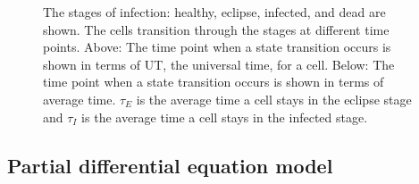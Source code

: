 \begin{figure}
\begin{tikzpicture}
    \end{tikzpicture}
\caption{The stages of infection: healthy, eclipse, infected, and dead are shown. The cells transition through the stages at different time points. Above: The time point when a state transition occurs is shown in terms of UT, the universal time, for a cell. %
Below: The time point when a state transition occurs is shown in terms of average time. $\tau_E$ is the average time a cell stays in  the eclipse stage and $\tau_I$ is the average time a cell stays in the infected stage. \label{fig:transitioning_through_the_stages_of_infection}}
\end{figure}

\subsection{Partial differential equation model} \label{PDEM}


